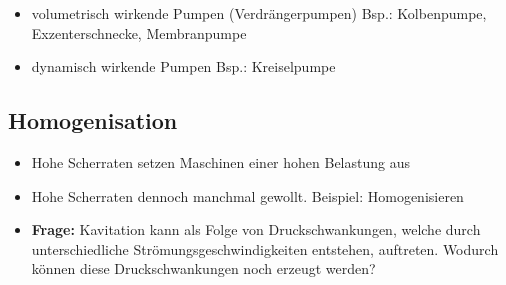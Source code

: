 \documentclass[a4paper,10pt]{article}
\begin{document}
\begin{itemize}
\item volumetrisch wirkende Pumpen (Verdrängerpumpen) \RA Bsp.: Kolbenpumpe, Exzenterschnecke, Membranpumpe
\item dynamisch wirkende Pumpen \RA
Bsp.: Kreiselpumpe
\end{itemize}

\subsection{Homogenisation}
\begin{itemize}
\item Hohe Scherraten setzen Maschinen einer hohen Belastung aus
\item Hohe Scherraten dennoch manchmal gewollt. Beispiel: Homogenisieren
\item \qssmall{}\textbf{Frage:} Kavitation kann als Folge von Druckschwankungen, welche durch unterschiedliche Strömungsgeschwindigkeiten entstehen, auftreten. Wodurch können diese Druckschwankungen noch erzeugt werden?
\end{itemize}

\pagebreak
\end{document}
